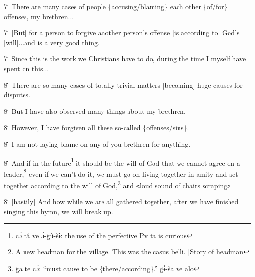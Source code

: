 7\. There are many cases of people \{accusing/blaming\} each other \{of/for\} offenses,
my brethren...

7\. [But] for a person to forgive another person's offense [is according to] God's
[will]...and is a very good thing.

7\. Since this is the work we Christians have to do, during the time I myself have
spent on this...

8\. There are so many cases of totally trivial matters [becoming] huge causes for
disputes.

8\. But I have also observed many things about my brethren.

8\. However, I have forgiven all these so-called \{offenses/sins\}.

8\. I am not laying blame on any of you brethren for anything.

8\. And if in the future\footnote{cɔ̀ tâ ve ɔ̀-g̈û-šɨ̄: the use of the perfective Pv tā is curious} it should be the will of God that we cannot agree on
a leader,\footnote{A new headman for the village. This was the casus belli. [Story of headman} even if we can't do it, we must go on living together in amity and
act together according to the will of God,\footnote{g̈a te cɔ̀: ``must cause to be \{there/according\}.'' g̈ɨ̀-ša ve alō} and \texttt{<}loud sound of chairs
scraping\texttt{>}

8\. [hastily] And how while we are all gathered together, after we have finished
singing this hymn, we will break up.

